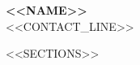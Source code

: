 \documentclass[letterpaper,10pt]{article}
\begin{document}
{\Large
\begin{center}
  \textbf{\Huge <<NAME>>} \\
  \small <<CONTACT_LINE>>
\end{center}
}

<<SECTIONS>>
\end{document}
